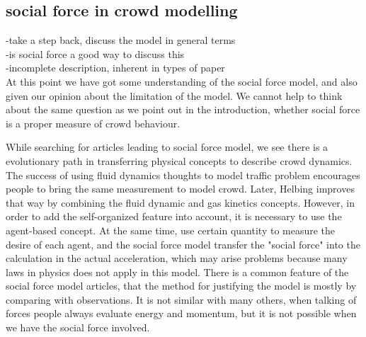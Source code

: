 \subsection{social force in crowd modelling}
-take a step back, discuss the model in general terms\\
-is social force a good way to discuss this \\
-incomplete description, inherent in types of paper\\
At this point we have got some understanding of the social force model, and 
also given our opinion about the limitation of the model. We cannot help to 
think about the same question as we point out in the introduction, whether 
social force is a proper measure of crowd behaviour. 

While searching for articles leading to social force model, we see there is a 
evolutionary path in transferring physical concepts to describe crowd dynamics.
The success of using fluid dynamics thoughts to model traffic problem encourages 
people to bring the same measurement to model crowd. 
Later, Helbing improves that way by combining the fluid dynamic and gas kinetics 
concepts. \cite{social-force} However, in order to add the self-organized feature 
into account, it is necessary to use the agent-based concept.  At the same time, 
use certain quantity to measure the desire of each agent, and the social force model 
transfer the "social force" into the calculation in the actual acceleration, which may
arise problems because many laws in physics does not apply in this model. 
There is a common feature of the social force model articles, that the method for 
justifying the model is mostly by comparing with observations. It is not 
similar with many others, when talking of forces people always evaluate energy 
and momentum, but it is not possible when we have the social force involved.
